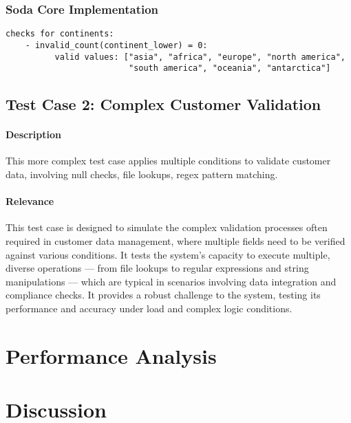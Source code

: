 \subsubsection{Soda Core Implementation}

\begin{verbatim}
checks for continents:
    - invalid_count(continent_lower) = 0:
          valid values: ["asia", "africa", "europe", "north america", 
                         "south america", "oceania", "antarctica"]
\end{verbatim}


\subsection{Test Case 2: Complex Customer Validation}

\paragraph{Description} This more complex test case applies multiple conditions to validate customer data, involving null checks, file lookups, regex pattern matching.

\paragraph{Relevance} This test case is designed to simulate the complex validation processes often required in customer data management, where multiple fields need to be verified against various conditions. It tests the system’s capacity to execute multiple, diverse operations — from file lookups to regular expressions and string manipulations — which are typical in scenarios involving data integration and compliance checks. It provides a robust challenge to the system, testing its performance and accuracy under load and complex logic conditions.


\section{Performance Analysis}



\section{Discussion}


